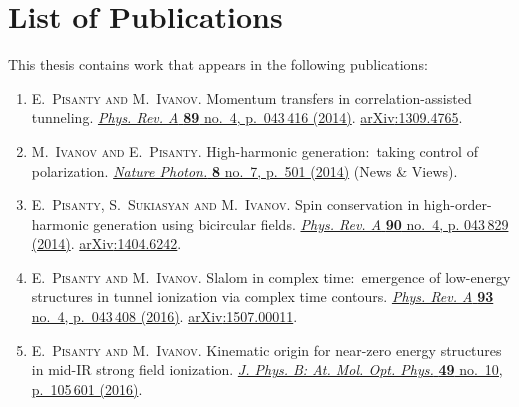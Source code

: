 






\chapter*{List of Publications}




This thesis contains work that appears in the following publications:



\begin{enumerate}
\item[{\hypersetup{citecolor=black}\cite{Pisanty_momentum_transfers_2014}}]
\textsc{E.~Pisanty and M.~Ivanov}.
\newblock Momentum transfers in correlation-assisted
  tunneling.
\newblock \href{http://dx.doi.org/10.1103/PhysRevA.89.043416}{
          \emph{Phys. Rev. A} \textbf{89} no.~4, p.~043\,416 (2014)}.
\newblock \href{http://arxiv.org/abs/1309.4765}{{arXiv}:1309.4765}.

\item[{\hypersetup{citecolor=black}\cite{Ivanov_nature_photonics_2014}}]
\textsc{M.~Ivanov and E.~Pisanty}.
\newblock High-harmonic generation:\ taking control of polarization.
\newblock \href{http://dx.doi.org/10.1038/nphoton.2014.141}{
          \emph{Nature Photon.} \textbf{8} no.~7, p.~501 (2014)} (News \& Views).

\item[{\hypersetup{citecolor=black}\cite{Pisanty_spin_conservation_2014}}]
\textsc{E.~Pisanty, S.~Sukiasyan and M.~Ivanov}.
\newblock Spin conservation in high-order-harmonic generation using bicircular fields. 
\newblock \href{http://dx.doi.org/10.1103/PhysRevA.90.043829}{
          \emph{Phys. Rev. A} \textbf{90} no.~4, p. 043\,829 (2014)}.
\newblock \href{http://arxiv.org/abs/1404.6242}{{arXiv}:1404.6242}.

\item[{\hypersetup{citecolor=black}\cite{Pisanty_slalom_2016}}]
\textsc{E.~Pisanty and M.~Ivanov}.
\newblock Slalom in complex time:\ emergence of low-energy structures in tunnel
  ionization via complex time contours.
\newblock \href{http://dx.doi.org/10.1103/PhysRevA.93.043408}{
          \emph{Phys. Rev. A} \textbf{93} no.~4, p.~043\,408 (2016)}.
\newblock \href{http://arxiv.org/abs/1507.00011}{{arXiv}:1507.00011}.

\item[{\hypersetup{citecolor=black}\cite{Pisanty_kinematic_2016}}]
\textsc{E.~Pisanty and M.~Ivanov}.
\newblock Kinematic origin for near-zero energy structures in mid-{IR} strong field ionization.
\newblock \href{http://dx.doi.org/10.1088/0953-4075/49/10/105601}{
          \emph{J. Phys. B: At. Mol. Opt. Phys.} \textbf{49} no.~10, p.~105\,601 (2016)}.


\end{enumerate}
